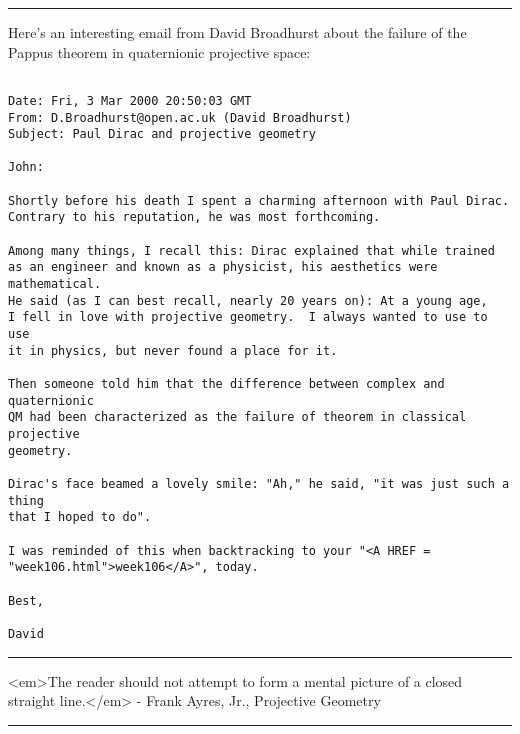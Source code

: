 \par\noindent\rule{\textwidth}{0.4pt}

Here's an interesting email from David Broadhurst 
about the failure of the Pappus theorem in quaternionic projective
space:



\begin{verbatim}

Date: Fri, 3 Mar 2000 20:50:03 GMT
From: D.Broadhurst@open.ac.uk (David Broadhurst)
Subject: Paul Dirac and projective geometry

John:

Shortly before his death I spent a charming afternoon with Paul Dirac.
Contrary to his reputation, he was most forthcoming.

Among many things, I recall this: Dirac explained that while trained
as an engineer and known as a physicist, his aesthetics were mathematical.
He said (as I can best recall, nearly 20 years on): At a young age,
I fell in love with projective geometry.  I always wanted to use to use 
it in physics, but never found a place for it.

Then someone told him that the difference between complex and quaternionic
QM had been characterized as the failure of theorem in classical projective 
geometry.

Dirac's face beamed a lovely smile: "Ah," he said, "it was just such a thing
that I hoped to do".

I was reminded of this when backtracking to your "<A HREF = "week106.html">week106</A>", today.

Best,

David
\end{verbatim}
    


 \par\noindent\rule{\textwidth}{0.4pt}
<em>The reader should not attempt to form a mental picture of a closed
straight line.</em> - Frank Ayres, Jr., Projective Geometry




 \par\noindent\rule{\textwidth}{0.4pt}


